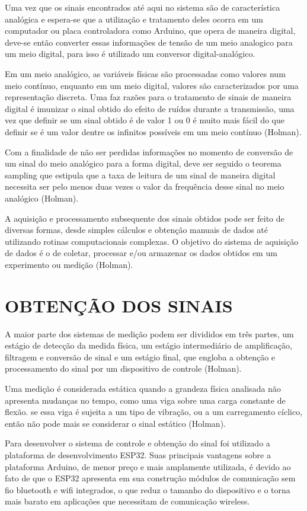 Uma vez que os sinais encontrados até aqui no sistema são de característica analógica e espera-se que a utilização e tratamento deles ocorra em um computador ou placa controladora como Arduino, que opera de maneira digital, deve-se então converter essas informações de tensão de um meio analogico para um meio digital, para isso é utilizado um conversor digital-analógico.

Em um meio analógico, as variáveis físicas são processadas como valores num meio contínuo, enquanto em um meio digital, valores são caracterizados por uma representação discreta. Uma faz razões para o tratamento de sinais de maneira digital é imunizar o sinal obtido do efeito de ruídos durante a transmissão, uma vez que definir se um sinal obtido é de valor 1 ou 0 é muito mais fácil do que definir se é um valor dentre os infinitos possíveis em um meio contínuo (Holman).

Com a finalidade de não ser perdidas informações no momento de conversão de um sinal do meio analógico para a forma digital, deve ser seguido o teorema sampling que estipula que a taxa de leitura de um sinal de maneira digital necessita ser pelo menos duas vezes o valor da frequência desse sinal no meio analógico (Holman).

A aquisição e processamento subsequente dos sinais obtidos pode ser feito de diversas formas, desde simples cálculos e obtenção manuais de dados até utilizando  rotinas computacionais complexas. O objetivo do sistema de aquisição de dados é o de coletar, processar e/ou armazenar os dados obtidos em um experimento ou medição (Holman).

\section{OBTENÇÃO DOS SINAIS}

A maior parte dos sistemas de medição podem ser divididos em três partes, um estágio de  detecção da medida física, um estágio intermediário de amplificação, filtragem e conversão de sinal e um estágio final, que engloba a obtenção e processamento do sinal por um dispositivo de controle (Holman).

Uma medição é considerada estática quando a grandeza física analisada não apresenta mudanças no tempo, como uma viga sobre uma carga constante de flexão. se essa viga é sujeita a um tipo de vibração, ou a um carregamento cíclico, então não pode mais se considerar o sinal estático (Holman).

Para desenvolver o sistema de controle e obtenção do sinal foi utilizado a plataforma de desenvolvimento ESP32. Suas principais vantagens sobre a plataforma Arduino, de menor preço e mais amplamente utilizada, é devido ao fato de que o ESP32 apresenta em sua construção módulos de comunicação sem fio bluetooth e wifi integrados, o que reduz o tamanho do dispositivo e o torna mais barato em aplicações que necessitam de comunicação wireless.

